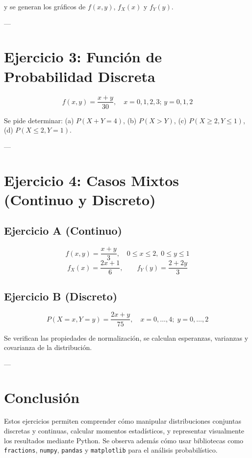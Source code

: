 \documentclass[12pt,a4paper]{article}
\begin{document}
y se generan los gráficos de \(f(x,y)\), \(f_X(x)\) y \(f_Y(y)\).

---

\section{Ejercicio 3: Función de Probabilidad Discreta}
\[
f(x,y) = \frac{x + y}{30}, \quad x=0,1,2,3; \, y=0,1,2
\]

Se pide determinar:  
(a) \(P(X+Y=4)\), (b) \(P(X>Y)\), (c) \(P(X \ge 2, Y \le 1)\), (d) \(P(X \le 2, Y = 1)\).

---

\section{Ejercicio 4: Casos Mixtos (Continuo y Discreto)}

\subsection*{Ejercicio A (Continuo)}
\[
f(x,y) = \frac{x+y}{3}, \quad 0 \le x \le 2,\; 0 \le y \le 1
\]
\[
f_X(x) = \frac{2x+1}{6}, \qquad f_Y(y) = \frac{2+2y}{3}
\]

\subsection*{Ejercicio B (Discreto)}
\[
P(X=x, Y=y) = \frac{2x + y}{75}, \quad x=0,\dots,4;\; y=0,\dots,2
\]

Se verifican las propiedades de normalización, se calculan esperanzas, varianzas y covarianza de la distribución.

---

\section*{Conclusión}
Estos ejercicios permiten comprender cómo manipular distribuciones conjuntas discretas y continuas, calcular momentos estadísticos, y representar visualmente los resultados mediante Python.  
Se observa además cómo usar bibliotecas como \texttt{fractions}, \texttt{numpy}, \texttt{pandas} y \texttt{matplotlib} para el análisis probabilístico.
\end{document}
